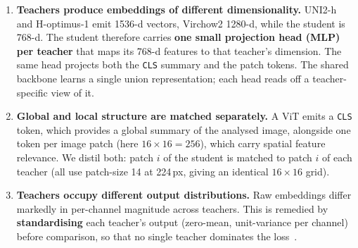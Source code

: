 \documentclass[10pt]{article}
\begin{document}
\begin{enumerate}[label=\textbf{\arabic*.}]
\item \textbf{Teachers produce embeddings of different dimensionality.} UNI2-h and H-optimus-1
emit 1536-d vectors, Virchow2 1280-d, while the student is 768-d. The student therefore carries
\textbf{one small projection head (MLP) per teacher} that maps its 768-d features to that teacher's
dimension. The same head projects both the \texttt{CLS} summary and the patch tokens. The shared
backbone learns a single union representation; each head reads off a teacher-specific view of it.

\item \textbf{Global and local structure are matched separately.} A ViT emits a \texttt{CLS}
token, which provides a global summary of the analysed image, alongside one token per image patch
(here $16\times16=256$), which carry spatial feature relevance. We distil both: patch $i$ of the
student is matched to patch $i$ of each teacher (all use patch-size 14 at 224\,px, giving an
identical $16\times16$ grid).

\item \textbf{Teachers occupy different output distributions.} Raw embeddings differ markedly in
per-channel magnitude across teachers. This is remedied by \textbf{standardising} each teacher's
output (zero-mean, unit-variance per channel) before comparison, so that no single teacher
dominates the loss~\cite{radio}.
\end{enumerate}
\end{document}
